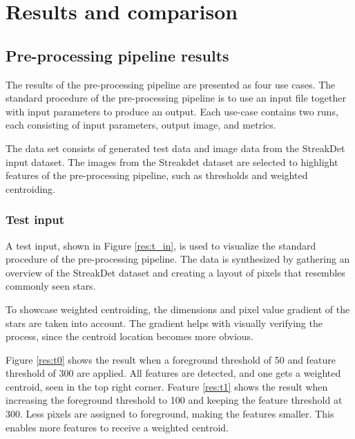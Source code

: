 \documentclass[12pt]{report}
\begin{document}
\chapter{Results and comparison}



\section{Pre-processing pipeline results}
The results of the pre-processing pipeline are presented as four use cases. The standard procedure of the pre-processing pipeline is to use an input file together with input parameters to produce an output. Each use-case contains two runs, each consisting of input parameters, output image, and metrics.  
\par
The data set consists of generated test data and image data from the StreakDet input dataset. The images from the Streakdet dataset are selected to highlight features of the pre-processing pipeline, such as thresholds and weighted centroiding.

\subsection*{Test input}
A test input, shown in Figure \ref{res:t_in}, is used to visualize the standard procedure of the pre-processing pipeline. The data is synthesized by gathering an overview of the StreakDet dataset and creating a layout of pixels that resembles commonly seen stars.
\par
To showcase weighted centroiding, the dimensions and pixel value gradient of the stars are taken into account. The gradient helps with visually verifying the process, since the centroid location becomes more obvious.
\par
Figure \ref{res:t0} shows the result when a foreground threshold of 50 and feature threshold of 300 are applied. All features are detected, and one gets a weighted centroid, seen in the top right corner. Feature \ref{res:t1} shows the result when increasing the foreground threshold to 100 and keeping the feature threshold at 300. Less pixels are assigned to foreground, making the features smaller. This enables more features to receive a weighted centroid. 
\end{document}
